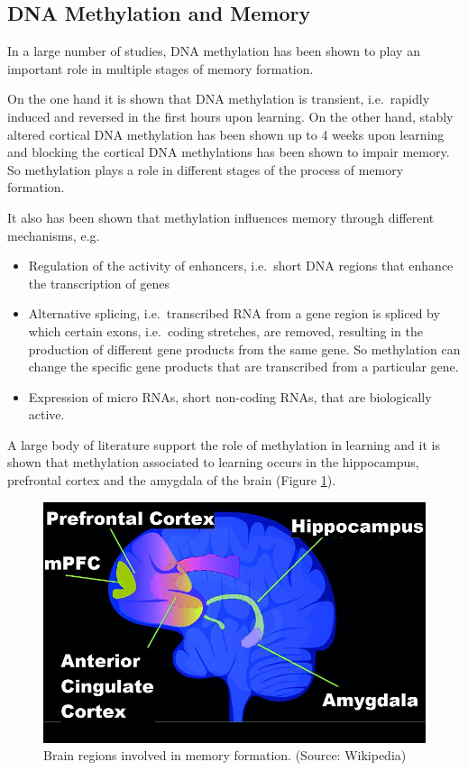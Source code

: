 \documentclass[
  11pt,
]{book}
\providecommand{\tightlist}{%
  \setlength{\itemsep}{0pt}\setlength{\parskip}{0pt}}
\begin{document}
\hypertarget{dna-methylation-and-memory}{%
\subsection{DNA Methylation and Memory}\label{dna-methylation-and-memory}}

In a large number of studies, DNA methylation has been shown to play an important role in multiple stages of memory formation.

On the one hand it is shown that DNA methylation is transient, i.e.~rapidly induced and reversed in the first hours upon learning. On the other hand, stably altered cortical DNA methylation has been shown up to 4 weeks upon learning and blocking the cortical DNA methylations has been shown to impair memory.
So methylation plays a role in different stages of the process of memory formation.

It also has been shown that methylation influences memory through different mechanisms, e.g.~

\begin{itemize}
\tightlist
\item
  Regulation of the activity of enhancers, i.e.~short DNA regions that enhance the transcription of genes
\item
  Alternative splicing, i.e.~transcribed RNA from a gene region is spliced by which certain exons, i.e.~coding stretches, are removed, resulting in the production of different gene products from the same gene. So methylation can change the specific gene products that are transcribed from a particular gene.
\item
  Expression of micro RNAs, short non-coding RNAs, that are biologically active.
\end{itemize}

A large body of literature support the role of methylation in learning and it is shown that methylation associated to learning occurs in the hippocampus, prefrontal cortex and the amygdala of the brain (Figure \ref{fig:brainRegionsLearning}).

\begin{figure}

{\centering \includegraphics[width=0.5\linewidth]{./figs/Brain_regions_in_memory_formation} 

}

\caption{Brain regions involved in memory formation. (Source: Wikipedia)}\label{fig:brainRegionsLearning}
\end{figure}
\end{document}

